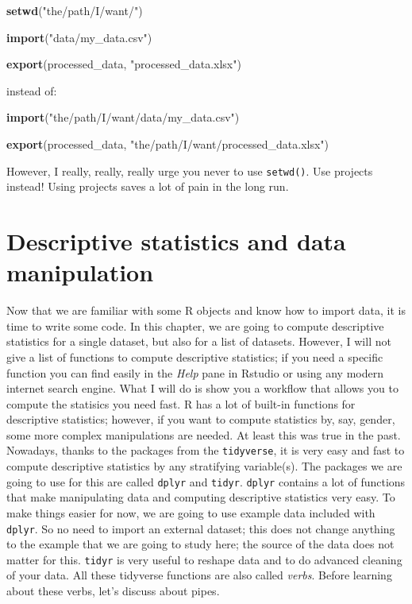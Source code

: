 \documentclass[]{gitbook}
\newenvironment{Shaded}{\begin{snugshade}}{\end{snugshade}}
\newcommand{\KeywordTok}[1]{\textcolor[rgb]{0.13,0.29,0.53}{\textbf{#1}}}
\newcommand{\NormalTok}[1]{#1}
\newcommand{\StringTok}[1]{\textcolor[rgb]{0.31,0.60,0.02}{#1}}
\theoremstyle{definition}
\theoremstyle{definition}
\theoremstyle{definition}
\theoremstyle{remark}
\begin{document}
\begin{Shaded}
\begin{Highlighting}[]
\KeywordTok{setwd}\NormalTok{(}\StringTok{"the/path/I/want/"}\NormalTok{)}

\KeywordTok{import}\NormalTok{(}\StringTok{"data/my_data.csv"}\NormalTok{)}

\KeywordTok{export}\NormalTok{(processed_data, }\StringTok{"processed_data.xlsx"}\NormalTok{)}
\end{Highlighting}
\end{Shaded}

instead of:

\begin{Shaded}
\begin{Highlighting}[]
\KeywordTok{import}\NormalTok{(}\StringTok{"the/path/I/want/data/my_data.csv"}\NormalTok{)}

\KeywordTok{export}\NormalTok{(processed_data, }\StringTok{"the/path/I/want/processed_data.xlsx"}\NormalTok{)}
\end{Highlighting}
\end{Shaded}

However, I really, really, really urge you never to use
\texttt{setwd()}. Use projects instead! Using projects saves a lot of
pain in the long run.

\hypertarget{descriptive-statistics-and-data-manipulation}{%
\section{Descriptive statistics and data
manipulation}\label{descriptive-statistics-and-data-manipulation}}

Now that we are familiar with some R objects and know how to import
data, it is time to write some code. In this chapter, we are going to
compute descriptive statistics for a single dataset, but also for a list
of datasets. However, I will not give a list of functions to compute
descriptive statistics; if you need a specific function you can find
easily in the \emph{Help} pane in Rstudio or using any modern internet
search engine. What I will do is show you a workflow that allows you to
compute the statisics you need fast. R has a lot of built-in functions
for descriptive statistics; however, if you want to compute statistics
by, say, gender, some more complex manipulations are needed. At least
this was true in the past. Nowadays, thanks to the packages from the
\texttt{tidyverse}, it is very easy and fast to compute descriptive
statistics by any stratifying variable(s). The packages we are going to
use for this are called \texttt{dplyr} and \texttt{tidyr}.
\texttt{dplyr} contains a lot of functions that make manipulating data
and computing descriptive statistics very easy. To make things easier
for now, we are going to use example data included with \texttt{dplyr}.
So no need to import an external dataset; this does not change anything
to the example that we are going to study here; the source of the data
does not matter for this. \texttt{tidyr} is very useful to reshape data
and to do advanced cleaning of your data. All these tidyverse functions
are also called \emph{verbs}. Before learning about these verbs, let's
discuss about pipes.
\end{document}
